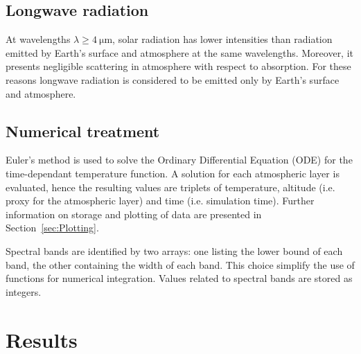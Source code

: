 \documentclass[a4paper,10pt,final,twocolumn]{article}
\begin{document}



\subsection{Longwave radiation}
At wavelengths $\lambda \geq \qty{4}{\micro\metre}$, solar radiation has lower intensities than radiation emitted by Earth's surface and atmosphere at the same wavelengths. Moreover, it presents negligible scattering in atmosphere with respect to absorption. For these reasons longwave radiation is considered to be emitted only by Earth's surface and atmosphere.\cite[468]{ramanathan}




\subsection{Numerical treatment} %

Euler's method is used to solve the Ordinary Differential Equation (ODE) for the time-dependant temperature function.\cite[472]{ramanathan} A solution for each atmospheric layer is evaluated, hence the resulting values are triplets of temperature, altitude (i.e. proxy for the atmospheric layer) and time (i.e. simulation time). Further information on storage and plotting of data are presented in Section~\ref{sec:Plotting}.

Spectral bands are identified by two arrays: one listing the lower bound of each band, the other containing the width of each band. This choice simplify the use of functions for numerical integration. Values related to spectral bands are stored as integers.



\section{Results}
\end{document}
